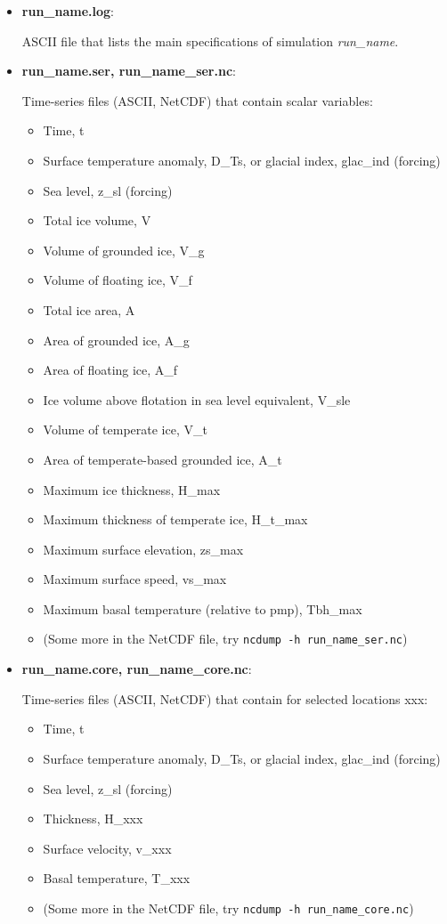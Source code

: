 \documentclass[12pt,a4paper]{article}
\begin{document}
\begin{itemize}

\item \textbf{run\_name.log}:

ASCII file that lists the main specifications of simulation \emph{run\_name}.

\item \textbf{run\_name.ser, run\_name\_ser.nc}:

Time-series files (ASCII, NetCDF) that contain scalar variables:
\begin{itemize}
\item Time, t
\item Surface temperature anomaly, D\_Ts, or glacial index, glac\_ind (forcing)
\item Sea level, z\_sl (forcing)
\item Total ice volume, V
\item Volume of grounded ice, V\_g
\item Volume of floating ice, V\_f
\item Total ice area, A
\item Area of grounded ice, A\_g
\item Area of floating ice, A\_f
\item Ice volume above flotation in sea level equivalent, V\_sle
\item Volume of temperate ice, V\_t
\item Area of temperate-based grounded ice, A\_t
\item Maximum ice thickness, H\_max
\item Maximum thickness of temperate ice, H\_t\_max
\item Maximum surface elevation, zs\_max
\item Maximum surface speed, vs\_max
\item Maximum basal temperature (relative to pmp), Tbh\_max
\item (Some more in the NetCDF file, try \verb+ncdump -h run_name_ser.nc+)
\end{itemize}

\item \textbf{run\_name.core, run\_name\_core.nc}:

Time-series files (ASCII, NetCDF) that contain for selected locations xxx:
\begin{itemize}
\item Time, t
\item Surface temperature anomaly, D\_Ts, or glacial index, glac\_ind (forcing)
\item Sea level, z\_sl (forcing)
\item Thickness, H\_xxx
\item Surface velocity, v\_xxx
\item Basal temperature, T\_xxx
\item (Some more in the NetCDF file, try \verb+ncdump -h run_name_core.nc+)
\end{itemize}


\end{itemize}
\end{document}
